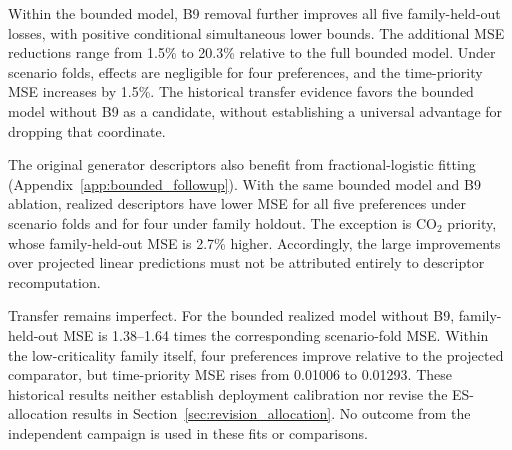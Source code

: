 Within the bounded model, B9 removal further improves all five family-held-out
losses, with positive conditional simultaneous lower bounds. The additional
MSE reductions range from 1.5\% to 20.3\% relative to the full bounded model.
Under scenario folds, effects are negligible for four preferences, and the
time-priority MSE increases by 1.5\%. The historical transfer evidence favors
the bounded model without B9 as a candidate, without establishing a universal
advantage for dropping that coordinate.

The original generator descriptors also benefit from fractional-logistic
fitting (Appendix~\ref{app:bounded_followup}). With the same bounded model
and B9 ablation, realized descriptors have lower MSE for all five preferences
under scenario folds and for four under family holdout. The exception is
CO$_2$ priority, whose family-held-out MSE is 2.7\% higher. Accordingly, the
large improvements over projected linear predictions must not be attributed
entirely to descriptor recomputation.

Transfer remains imperfect. For the bounded realized model without B9,
family-held-out MSE is 1.38--1.64 times the corresponding scenario-fold MSE.
Within the low-criticality family itself, four preferences improve relative
to the projected comparator, but time-priority MSE rises from 0.01006 to
0.01293. These historical results neither establish deployment calibration
nor revise the ES-allocation results in Section~\ref{sec:revision_allocation}.
No outcome from the independent campaign is used in these fits or comparisons.
